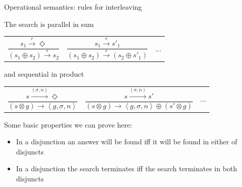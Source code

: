 \documentclass{beamer}
\let\\\tabularnewline
\let\\\tabularnewline
\newcommand{\inbr}[1]{\left<{#1}\right>}
\theoremstyle{definition}
\theoremstyle{plain} %
\begin{document}
\begin{frame}{Operational semantics: rules for interleaving}
    
The search is parallel in sum

\begin{center}
\begin{tabular}{lll}

$\dfrac{s_1 \xrightarrow{r} \Diamond}{(s_1 \oplus s_2) \xrightarrow{r} s_2}$ &

$\dfrac{s_1 \xrightarrow{r} s'_1}{(s_1 \oplus s_2) \xrightarrow{r} (s_2 \oplus s'_1)}$ &

... \\

\end{tabular}
\end{center}

\vskip4mm

and sequential in product

\begin{center}
\begin{tabular}{lll}

$\dfrac{s \xrightarrow{(\sigma, n)} \Diamond}{(s \otimes g) \xrightarrow{} \inbr{g, \sigma, n}} $ &

$\dfrac{s \xrightarrow{(\sigma, n)} s'}{(s \otimes g) \xrightarrow{} \inbr{g, \sigma, n} \oplus (s' \otimes g)}$ &

... \\

\end{tabular}
\end{center}

\pause

\vskip5mm

Some basic properties we can prove here:

\begin{itemize}
\item In a disjunction an answer will be found iff it will be found in either of disjuncts
\item In a disjunction the search terminates iff the search terminates in both disjuncts
\end{itemize}

\end{frame}
\end{document}
